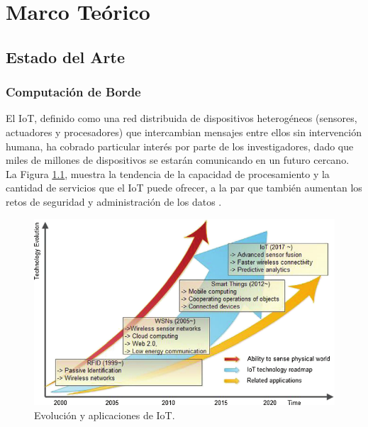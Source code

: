 
\chapter{Marco Teórico} %
\label{Chapter6}
\section{Estado del Arte}

\subsection{Computación de Borde}

El IoT, definido como una red distribuida de dispositivos heterogéneos (sensores, actuadores y procesadores) que intercambian mensajes entre ellos sin intervención humana, ha cobrado particular interés por parte de los investigadores, dado que miles de millones de dispositivos se estarán comunicando en un futuro cercano. La Figura \ref{fig:IoTEvol}, muestra la tendencia de la capacidad de procesamiento y la cantidad de servicios que el IoT puede ofrecer, a la par que también aumentan los retos de seguridad y administración de los datos \citep{li2015internet,stojmenovic2014fog}.
 
\begin{figure}[!ht]
	\centering
		\includegraphics[scale=1.2]{Figures/IoTEvol}
	\caption{Evolución y aplicaciones de IoT\cite{li2015internet}.}
	\label{fig:IoTEvol}
\end{figure}

